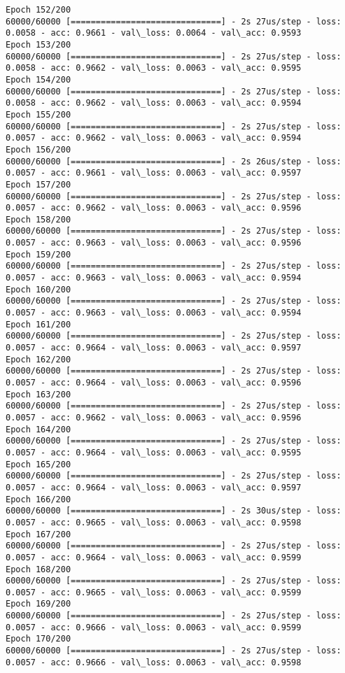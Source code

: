 \documentclass[11pt]{article}
\begin{document}
\begin{Verbatim}[commandchars=\\\{\}]
Epoch 152/200
60000/60000 [==============================] - 2s 27us/step - loss: 0.0058 - acc: 0.9661 - val\_loss: 0.0064 - val\_acc: 0.9593
Epoch 153/200
60000/60000 [==============================] - 2s 27us/step - loss: 0.0058 - acc: 0.9662 - val\_loss: 0.0063 - val\_acc: 0.9595
Epoch 154/200
60000/60000 [==============================] - 2s 27us/step - loss: 0.0058 - acc: 0.9662 - val\_loss: 0.0063 - val\_acc: 0.9594
Epoch 155/200
60000/60000 [==============================] - 2s 27us/step - loss: 0.0057 - acc: 0.9662 - val\_loss: 0.0063 - val\_acc: 0.9594
Epoch 156/200
60000/60000 [==============================] - 2s 26us/step - loss: 0.0057 - acc: 0.9661 - val\_loss: 0.0063 - val\_acc: 0.9597
Epoch 157/200
60000/60000 [==============================] - 2s 27us/step - loss: 0.0057 - acc: 0.9662 - val\_loss: 0.0063 - val\_acc: 0.9596
Epoch 158/200
60000/60000 [==============================] - 2s 27us/step - loss: 0.0057 - acc: 0.9663 - val\_loss: 0.0063 - val\_acc: 0.9596
Epoch 159/200
60000/60000 [==============================] - 2s 27us/step - loss: 0.0057 - acc: 0.9663 - val\_loss: 0.0063 - val\_acc: 0.9594
Epoch 160/200
60000/60000 [==============================] - 2s 27us/step - loss: 0.0057 - acc: 0.9663 - val\_loss: 0.0063 - val\_acc: 0.9594
Epoch 161/200
60000/60000 [==============================] - 2s 27us/step - loss: 0.0057 - acc: 0.9664 - val\_loss: 0.0063 - val\_acc: 0.9597
Epoch 162/200
60000/60000 [==============================] - 2s 27us/step - loss: 0.0057 - acc: 0.9664 - val\_loss: 0.0063 - val\_acc: 0.9596
Epoch 163/200
60000/60000 [==============================] - 2s 27us/step - loss: 0.0057 - acc: 0.9662 - val\_loss: 0.0063 - val\_acc: 0.9596
Epoch 164/200
60000/60000 [==============================] - 2s 27us/step - loss: 0.0057 - acc: 0.9664 - val\_loss: 0.0063 - val\_acc: 0.9595
Epoch 165/200
60000/60000 [==============================] - 2s 27us/step - loss: 0.0057 - acc: 0.9664 - val\_loss: 0.0063 - val\_acc: 0.9597
Epoch 166/200
60000/60000 [==============================] - 2s 30us/step - loss: 0.0057 - acc: 0.9665 - val\_loss: 0.0063 - val\_acc: 0.9598
Epoch 167/200
60000/60000 [==============================] - 2s 27us/step - loss: 0.0057 - acc: 0.9664 - val\_loss: 0.0063 - val\_acc: 0.9599
Epoch 168/200
60000/60000 [==============================] - 2s 27us/step - loss: 0.0057 - acc: 0.9665 - val\_loss: 0.0063 - val\_acc: 0.9599
Epoch 169/200
60000/60000 [==============================] - 2s 27us/step - loss: 0.0057 - acc: 0.9666 - val\_loss: 0.0063 - val\_acc: 0.9599
Epoch 170/200
60000/60000 [==============================] - 2s 27us/step - loss: 0.0057 - acc: 0.9666 - val\_loss: 0.0063 - val\_acc: 0.9598

\end{Verbatim}
\end{document}
